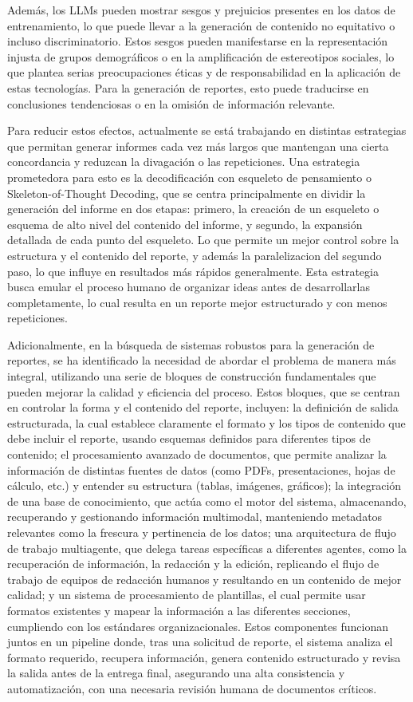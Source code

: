 Además, los LLMs pueden mostrar sesgos y prejuicios presentes en los datos de entrenamiento, lo que puede llevar a la generación de contenido no equitativo o incluso discriminatorio. Estos sesgos pueden manifestarse en la representación injusta de grupos demográficos o en la amplificación de estereotipos sociales, lo que plantea serias preocupaciones éticas y de responsabilidad en la aplicación de estas tecnologías. Para la generación de reportes, esto puede traducirse en conclusiones tendenciosas o en la omisión de información relevante.

Para reducir estos efectos, actualmente se está trabajando en distintas estrategias que permitan generar informes cada vez más largos que mantengan una cierta concordancia y reduzcan la divagación o las repeticiones. Una estrategia prometedora para esto es la decodificación con esqueleto de pensamiento o Skeleton-of-Thought Decoding, que se centra principalmente en dividir la generación del informe en dos etapas: primero, la creación de un esqueleto o esquema de alto nivel del contenido del informe, y segundo, la expansión detallada de cada punto del esqueleto. Lo que permite un mejor control sobre la estructura y el contenido del reporte, y además la paralelizacion del segundo paso, lo que influye en resultados más rápidos generalmente. Esta estrategia busca emular el proceso humano de organizar ideas antes de desarrollarlas completamente, lo cual resulta en un reporte mejor estructurado y con menos repeticiones.

Adicionalmente, en la búsqueda de sistemas robustos para la generación de reportes, se ha identificado la necesidad de abordar el problema de manera más integral, utilizando una serie de bloques de construcción fundamentales que pueden mejorar la calidad y eficiencia del proceso. Estos bloques, que se centran en controlar la forma y el contenido del reporte, incluyen: la definición de salida estructurada, la cual establece claramente el formato y los tipos de contenido que debe incluir el reporte, usando esquemas definidos para diferentes tipos de contenido; el procesamiento avanzado de documentos, que permite analizar la información de distintas fuentes de datos (como PDFs, presentaciones, hojas de cálculo, etc.) y entender su estructura (tablas, imágenes, gráficos); la integración de una base de conocimiento, que actúa como el motor del sistema, almacenando, recuperando y gestionando información multimodal, manteniendo metadatos relevantes como la frescura y pertinencia de los datos; una arquitectura de flujo de trabajo multiagente, que delega tareas específicas a diferentes agentes, como la recuperación de información, la redacción y la edición, replicando el flujo de trabajo de equipos de redacción humanos y resultando en un contenido de mejor calidad; y un sistema de procesamiento de plantillas, el cual permite usar formatos existentes y mapear la información a las diferentes secciones, cumpliendo con los estándares organizacionales. Estos componentes funcionan juntos en un pipeline donde, tras una solicitud de reporte, el sistema analiza el formato requerido, recupera información, genera contenido estructurado y revisa la salida antes de la entrega final, asegurando una alta consistencia y automatización, con una necesaria revisión humana de documentos críticos.


